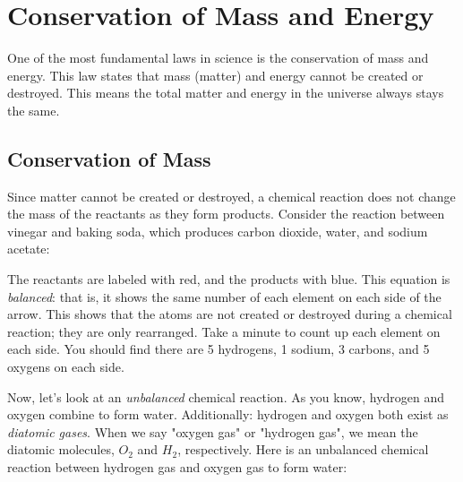 \chapter{Conservation of Mass and Energy}

One of the most fundamental laws in science is the conservation of mass and 
energy. This law states that mass (matter) and energy cannot be created or 
destroyed. This means the total matter and energy in the universe always stays 
the same. 

\section{Conservation of Mass}
Since matter cannot be created or destroyed, a chemical reaction does not change 
the mass of the reactants as they form products. Consider the reaction between 
vinegar and baking soda, which produces carbon dioxide, water, and sodium acetate:

\begin{center}
\end{center}

The reactants are labeled with red, and the products with blue. This equation is
\textit{balanced}: that is, it shows the same number of each element on each side
of the arrow. This shows that the atoms are not created or destroyed during a 
chemical reaction; they are only rearranged. Take a minute to count up each 
element on each side. You should find there are 5 hydrogens, 1 sodium, 3 carbons,
and 5 oxygens on each side. 

Now, let's look at an \textit{unbalanced} chemical reaction. As you know, hydrogen
and oxygen combine to form water. Additionally: hydrogen and oxygen both exist as
\textit{diatomic gases}. When we say "oxygen gas" or "hydrogen gas", we mean the 
diatomic molecules, $O_2$ and $H_2$, respectively. Here is an unbalanced chemical 
reaction between hydrogen gas and oxygen gas to form water:

